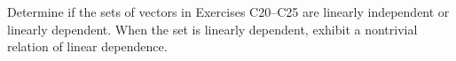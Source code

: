 \begin{exercisegroup}
\begin{para}Determine if the sets of vectors in Exercises C20--C25 are linearly independent or linearly dependent.  When the set is linearly dependent, exhibit a nontrivial relation of linear dependence.\end{para}
\end{exercisegroup}
%
%
%

